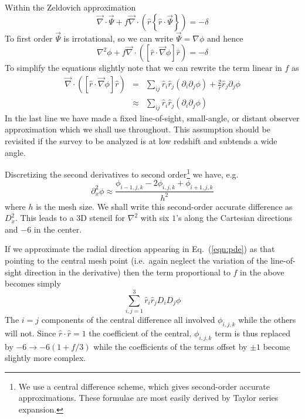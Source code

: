 \documentclass[a4paper,11pt]{article}
\begin{document}
Within the Zeldovich approximation \cite{Zel70}
\begin{equation}
  \vec{\nabla}\cdot\vec{\Psi} + f\vec{\nabla}\cdot
  \left(\hat{r}\left\{\hat{r}\cdot\vec{\Psi}\right\}\right)
  = -\delta
\end{equation}
To first order $\vec{\Psi}$ is irrotational, so we can write
$\vec{\Psi}=\nabla\phi$ and hence
\begin{equation}
  \nabla^2\phi +
  f\vec{\nabla}\cdot\left( \left[\hat{r}\cdot\vec{\nabla}\phi\right]
  \hat{r}\right) = -\delta
\label{eqn:pde}
\end{equation}
To simplify the equations slightly note that we can rewrite the term
linear in $f$ as
\begin{eqnarray}
 \vec{\nabla}\cdot\left( \left[\hat{r}\cdot\vec{\nabla}\phi\right]\hat{r}\right)
 &=& \sum_{ij}\hat{r}_i\hat{r}_j\left(\partial_i\partial_j\phi\right)
  +  \frac{2}{r}\hat{r}_j\partial_j\phi \\
 &\approx& \sum_{ij}\hat{r}_i\hat{r}_j\left(\partial_i\partial_j\phi\right)
\label{eqn:fterm}
\end{eqnarray}
In the last line we have made a fixed line-of-sight, small-angle, or distant
observer approximation which we shall use throughout.  This assumption
should be revisited if the survey to be analyzed is at low redshift and
subtends a wide angle.

Discretizing the second derivatives to second order\footnote{We use a central
difference scheme, which gives second-order accurate approximations.  These
formulae are most easily derived by Taylor series expansion.} 
we have, e.g.
\begin{equation}
  \partial_x^2\phi \approx \frac{\phi_{i-1,j,k}-2\phi_{i,j,k}+\phi_{i+1,j,k}}
  {h^2}
\end{equation}
where $h$ is the mesh size.  We shall write this second-order accurate
difference as $D_x^2$.  This leads to a 3D stencil for $\nabla^2$ with
six $1$'s along the Cartesian directions and $-6$ in the center.

If we approximate the radial direction appearing in Eq.~(\ref{eqn:pde})
as that pointing to the central mesh point (i.e.~again neglect the variation
of the line-of-sight direction in the derivative) then the term proportional
to $f$ in the above becomes simply
\begin{equation}
  \sum_{i,j=1}^3 \hat{r}_i\hat{r}_j D_iD_j \phi
\label{eqn:ffinite}
\end{equation}
The $i=j$ components of the central difference all involved $\phi_{i,j,k}$
while the others will not.  Since $\hat{r}\cdot\hat{r}=1$ the coefficient
of the central, $\phi_{i,j,k}$ term is thus replaced by $-6\to -6(1+f/3)$
while the coefficients of the terms offset by $\pm 1$ become slightly more
complex.
\end{document}
